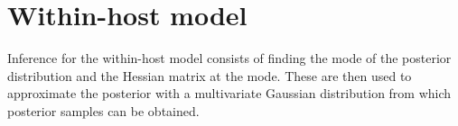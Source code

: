 \documentclass{article}
\begin{document}
\section{Within-host model}
Inference for the within-host model consists of finding the mode of the posterior distribution and the Hessian matrix at the mode.
These are then used to approximate the posterior with a multivariate Gaussian distribution from which posterior samples can be obtained.
\end{document}

